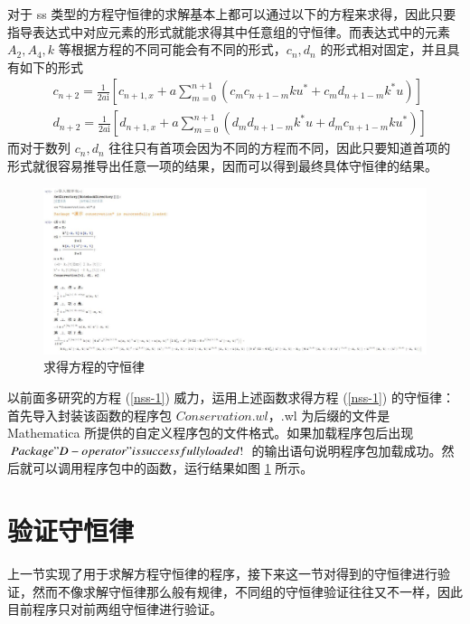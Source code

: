 对于 ss 类型的方程守恒律的求解基本上都可以通过以下的方程来求得，因此只要指导表达式中对应元素的形式就能求得其中任意组的守恒律。而表达式中的元素 $A_2, A_4, k$ 等根据方程的不同可能会有不同的形式，$c_n, d_n$ 的形式相对固定，并且具有如下的形式
\begin{align}
  & c_{n+2} = \frac{1}{2a\mathrm{i}} \left[c_{n+1,x} + a\sum_{m=0}^{n+1}(c_{m}c_{n+1-m}ku^{*} + c_{m}d_{n+1-m}k^{*}u)\right] \\
  & d_{n+2} = \frac{1}{2a\mathrm{i}} \left[ d_{n+1,x} + a\sum_{m=0}^{n+1}(d_{m}d_{n+1-m}k^{*}u + d_{m}c_{n+1-m}ku^{*}) \right]
\end{align}
而对于数列 $c_n, d_n$ 往往只有首项会因为不同的方程而不同，因此只要知道首项的形式就很容易推导出任意一项的结果，因而可以得到最终具体守恒律的结果。

\begin{figure}[!htp]
\centering
\includegraphics[width=\linewidth]{getConservation.jpg}
\caption{求得方程的守恒律}
\label{picture-5-1}
\end{figure}

以前面多研究的方程 (\ref{nss-1}) 威力，运用上述函数求得方程 (\ref{nss-1}) 的守恒律：首先导入封装该函数的程序包 $Conservation.wl$，.wl 为后缀的文件是 Mathematica 所提供的自定义程序包的文件格式。如果加载程序包后出现 $Package "D-operator" is successfully loaded!$ 的输出语句说明程序包加载成功。然后就可以调用程序包中的函数，运行结果如图 \ref{picture-5-1} 所示。


\section{验证守恒律}
上一节实现了用于求解方程守恒律的程序，接下来这一节对得到的守恒律进行验证，然而不像求解守恒律那么般有规律，不同组的守恒律验证往往又不一样，因此目前程序只对前两组守恒律进行验证。

